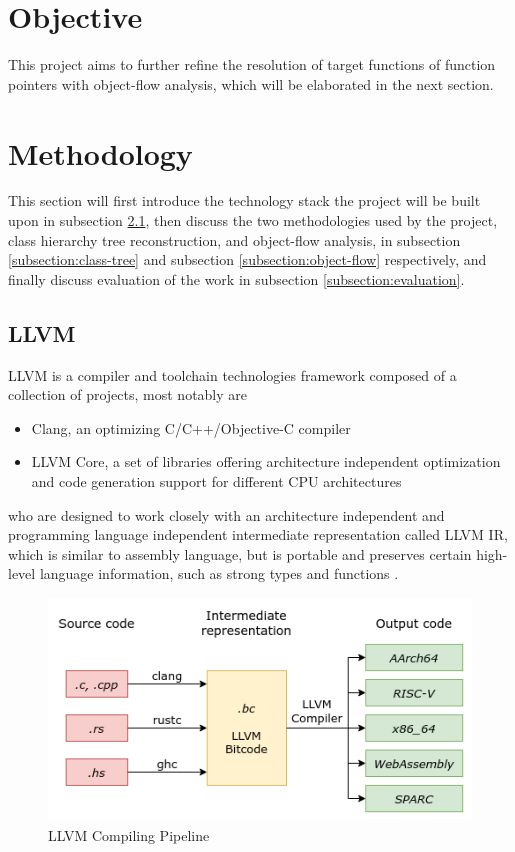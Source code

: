\documentclass[12pt]{article}
\begin{document}
\section{Objective}
This project aims to further refine the resolution of target functions of function pointers with object-flow analysis, which will be elaborated in the next section.

\section{Methodology}

This section will first introduce the technology stack the project will be built upon in subsection \ref{subsection:llvm}, then discuss the two methodologies used by the project, class hierarchy tree reconstruction, and object-flow analysis, in subsection \ref{subsection:class-tree} and subsection \ref{subsection:object-flow} respectively, and finally discuss evaluation of the work in subsection \ref{subsection:evaluation}.

\subsection{LLVM}
\label{subsection:llvm}

LLVM is a compiler and toolchain technologies framework \cite{llvm-website} composed of a collection of projects, most notably are

\begin{itemize}
    \item Clang, an optimizing C/C++/Objective-C compiler
    \item LLVM Core, a set of libraries offering architecture independent optimization and code generation support for different CPU architectures
\end{itemize}

who are designed to work closely with an architecture independent and programming language independent intermediate representation called LLVM IR, which is similar to assembly language, but is portable and preserves certain high-level language information, such as strong types and functions \cite{llvm-ir}.

\begin{figure}[t]
    \centering
    \includegraphics[keepaspectratio,width=0.6\paperwidth]{llvm-compiler.png}
    \caption{LLVM Compiling Pipeline \cite{llvm-pipeline}}
    \label{fig:llvm-compiler}
\end{figure}
\end{document}
